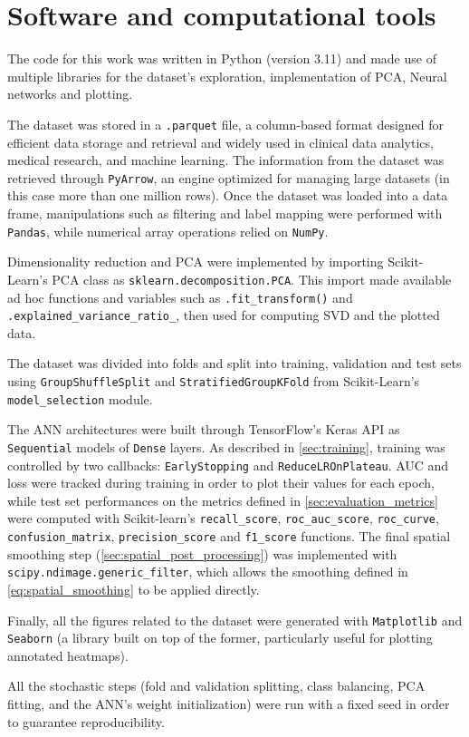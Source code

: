 \section{Software and computational tools}
\label{sec:software_tools}

The code for this work was written in Python (version 3.11) and made use of multiple libraries for the dataset's exploration, implementation of PCA, Neural networks and plotting.

The dataset was stored in a \texttt{.parquet} file, a column-based format designed for efficient data storage and retrieval and widely used in clinical data analytics, medical research, and machine learning. The information from the dataset was retrieved through \texttt{PyArrow}, an engine optimized for managing large datasets (in this case more than one million rows). Once the dataset was loaded into a data frame, manipulations such as filtering and label mapping were performed with \texttt{Pandas}, while numerical array operations relied on \texttt{NumPy}.

Dimensionality reduction and PCA were implemented by importing Scikit-Learn's PCA class as \texttt{sklearn.decomposition.PCA}. This import made available ad hoc functions and variables such as \texttt{.fit\_transform()} and \texttt{.explained\_variance\_ratio\_}, then used for computing SVD and the plotted data.

The dataset was divided into folds and split into training, validation and test sets using \texttt{GroupShuffleSplit} and \texttt{StratifiedGroupKFold} from Scikit-Learn's \texttt{model\_selection} module.

The ANN architectures were built through TensorFlow's Keras API as \texttt{Sequential} models of \texttt{Dense} layers. As described in \cref{sec:training}, training was controlled by two callbacks: \texttt{EarlyStopping} and \texttt{ReduceLROnPlateau}. AUC and loss were tracked during training in order to plot their values for each epoch, while test set performances on the metrics defined in \cref{sec:evaluation_metrics} were computed with Scikit-learn's \texttt{recall\_score}, \texttt{roc\_auc\_score}, \texttt{roc\_curve}, \texttt{confusion\_matrix}, \texttt{precision\_score} and \texttt{f1\_score} functions.
The final spatial smoothing step (\cref{sec:spatial_post_processing}) was implemented with \texttt{scipy.ndimage.generic\_filter}, which allows the smoothing defined in \cref{eq:spatial_smoothing} to be applied directly.

Finally, all the figures related to the dataset were generated with \texttt{Matplotlib} and \texttt{Seaborn} (a library built on top of the former, particularly useful for plotting annotated heatmaps).

All the stochastic steps (fold and validation splitting, class balancing, PCA fitting, and the ANN's weight initialization) were run with a fixed seed in order to guarantee reproducibility.


